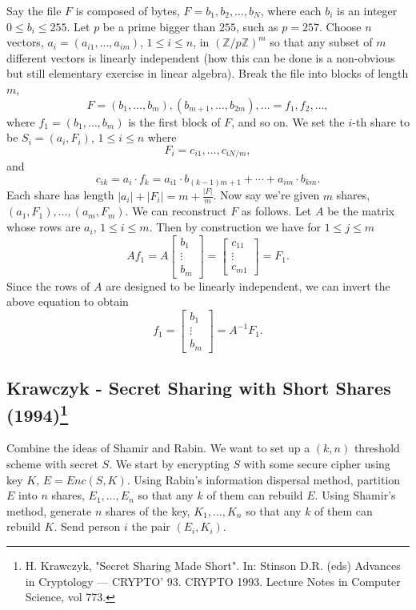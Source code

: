 \documentclass[12pt]{article}
\newcommand{\integers}{\mathbb{Z}}
\begin{document}
\noindent Say the file $F$ is composed of bytes, $F = b_1, b_2, \ldots, b_N$, where each $b_i$ is an integer $0\leq b_i\leq 255$. Let $p$ be a prime bigger than $255$, such as $p = 257$. Choose $n$ vectors, $a_i = (a_{i1}, \ldots, a_{im})$, $1\leq i\leq n$, in $(\integers/p\integers)^m$ so that any subset of $m$ different vectors is linearly independent (how this can be done is a non-obvious but still elementary exercise in linear algebra). Break the file into blocks of length $m$,
\[
F = (b_1, \ldots, b_m), (b_{m+1}, \ldots, b_{2m}), \ldots = f_1, f_2, \ldots,
\]
 where $f_1 = (b_1, \ldots, b_m)$ is the first block of $F$, and so on. We set the $i$-th share to be $S_i = (a_i, F_i)$, $1\leq i\leq n$ where
 \[
 F_i = c_{i1}, \ldots, c_{iN/m},
 \]
 and
 \[
 c_{ik} = a_i\cdot f_k = a_{i1}\cdot b_{(k-1)m+1} + \cdots +a_{im}\cdot b_{km}.
 \]
 Each share has length $|a_i| + |F_i| = m + \frac{|F|}{m}$. Now say we're given $m$ shares, $(a_1, F_1), \ldots, (a_m, F_m)$. We can reconstruct $F$ as follows. Let $A$ be the matrix whose rows are $a_i$, $1\leq i\leq m$. Then by construction we have for $1\leq j\leq m$
 \[
 A f_1 = A\begin{bmatrix}
 	b_1\\
 	\vdots\\
 	b_m
 \end{bmatrix} = \begin{bmatrix}
 	c_{11}\\
 	\vdots\\
 	c_{m1}
 \end{bmatrix} = F_1.
 \]
 Since the rows of $A$ are designed to be linearly independent, we can invert the above equation to obtain
 \[
 f_1 = \begin{bmatrix}
 	b_1\\
 	\vdots\\
 	b_m
 \end{bmatrix} = A^{-1} F_1.
 \]

\subsection*{Krawczyk - Secret Sharing with Short Shares (1994)\footnote{H. Krawczyk, "Secret Sharing Made Short". In: Stinson D.R. (eds) Advances in Cryptology — CRYPTO’ 93. CRYPTO 1993. Lecture Notes in Computer Science, vol 773.}}
Combine the ideas of Shamir and Rabin. We want to set up a $(k,n)$ threshold scheme with secret $S$. We start by encrypting $S$ with some secure cipher using key $K$, $E = Enc(S, K)$. Using Rabin's information dispersal method, partition $E$ into $n$ shares, $E_1, \ldots, E_n$ so that any $k$ of them can rebuild $E$. Using Shamir's method, generate $n$ shares of the key, $K_1, \ldots, K_n$ so that any $k$ of them can rebuild $K$. Send person $i$ the pair $(E_i, K_i)$.\\
\end{document}
